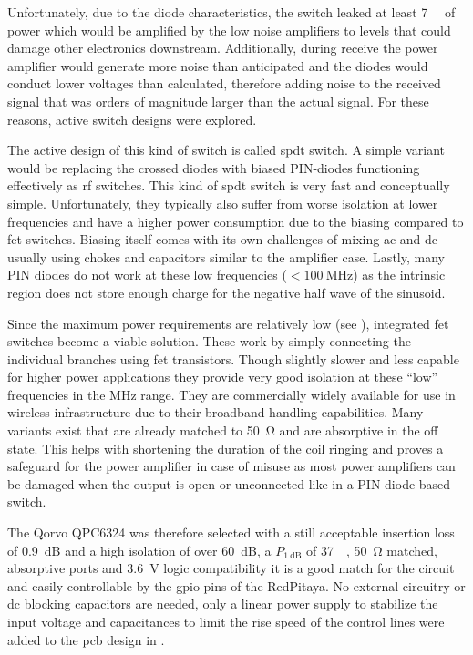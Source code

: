Unfortunately, due to the diode characteristics, the switch leaked at least \qty{7}{\deci\belm} of power which would be amplified by the low noise amplifiers to levels that could damage other electronics downstream. Additionally, during receive the power amplifier would generate more noise than anticipated and the diodes would conduct lower voltages than calculated, therefore adding noise to the received signal that was orders of magnitude larger than the actual signal. For these reasons, active switch designs were explored.

The active design of this kind of switch is called \acrfull{spdt} switch. A simple variant would be replacing the crossed diodes with biased PIN-diodes functioning effectively as \acrshort{rf} switches. This kind of \acrshort{spdt} switch is very fast and conceptually simple. Unfortunately, they typically also suffer from worse isolation at lower frequencies and have a higher power consumption due to the biasing compared to \acrshort{fet} switches. Biasing itself comes with its own challenges of mixing \acrshort{ac} and \acrshort{dc} usually using chokes and capacitors similar to the amplifier case. Lastly, many PIN diodes do not work at these low frequencies (\(<\qty{100}{\mega\hertz}\)) as the intrinsic region does not store enough charge for the negative half wave of the sinusoid.

Since the maximum power requirements are relatively low (see ), integrated \acrshort{fet} switches become a viable solution. These work by simply connecting the individual branches using \acrshort{fet} transistors. Though slightly slower and less capable for higher power applications they provide very good isolation at these \enquote{low} frequencies in the \unit{\mega\hertz} range. They are commercially widely available for use in wireless infrastructure due to their broadband handling capabilities. Many variants exist that are already matched to \qty{50}{\ohm} and are absorptive in the off state. This helps with shortening the duration of the coil ringing and proves a safeguard for the power amplifier in case of misuse as most power amplifiers can be damaged when the output is open or unconnected like in a PIN-diode-based switch.

The Qorvo QPC6324 was therefore selected with a still acceptable insertion loss of \qty{0.9}{\deci\bel} and a high isolation of over \qty{60}{\deci\bel}, a \(P_{\qty{1}{\deci\bel}}\) of \qty{37}{\deci\belm}, \qty{50}{\ohm} matched, absorptive ports and \qty{3.6}{\volt} logic compatibility it is a good match for the circuit and easily controllable by the \acrfull{gpio} pins of the RedPitaya. No external circuitry or \acrshort{dc} blocking capacitors are needed, only a linear power supply to stabilize the input voltage and capacitances to limit the rise speed of the control lines were added to the \acrshort{pcb} design in .

